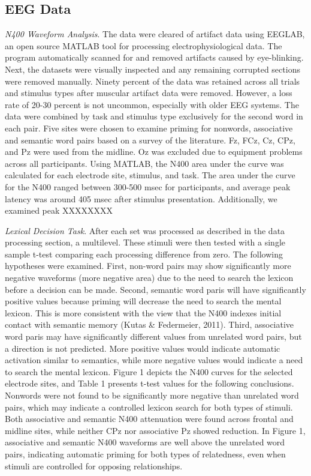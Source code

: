 \documentclass[english,man]{apa6}
\theoremstyle{definition}
\theoremstyle{definition}
\theoremstyle{remark}
\begin{document}
\subsection{EEG Data}\label{eeg-data}

\emph{N400 Waveform Analysis}. The data were cleared of artifact data
using EEGLAB, an open source MATLAB tool for processing
electrophysiological data. The program automatically scanned for and
removed artifacts caused by eye-blinking. Next, the datasets were
visually inspected and any remaining corrupted sections were removed
manually. Ninety percent of the data was retained across all trials and
stimulus types after muscular artifact data were removed. However, a
loss rate of 20-30 percent is not uncommon, especially with older EEG
systems. The data were combined by task and stimulus type exclusively
for the second word in each pair. Five sites were chosen to examine
priming for nonwords, associative and semantic word pairs based on a
survey of the literature. Fz, FCz, Cz, CPz, and Pz were used from the
midline. Oz was excluded due to equipment problems across all
participants. Using MATLAB, the N400 area under the curve was calculated
for each electrode site, stimulus, and task. The area under the curve
for the N400 ranged between 300-500 msec for participants, and average
peak latency was around 405 msec after stimulus presentation.
Additionally, we examined peak XXXXXXXX

\emph{Lexical Decision Task}. After each set was processed as described
in the data processing section, a multilevel. These stimuli were then
tested with a single sample t-test comparing each processing difference
from zero. The following hypotheses were examined. First, non-word pairs
may show significantly more negative waveforms (more negative area) due
to the need to search the lexicon before a decision can be made. Second,
semantic word paris will have significantly positive values because
priming will decrease the need to search the mental lexicon. This is
more consistent with the view that the N400 indexes initial contact with
semantic memory (Kutas \& Federmeier, 2011). Third, associative word
paris may have significantly different values from unrelated word pairs,
but a direction is not predicted. More positive values would indicate
automatic activation similar to semantics, while more negative values
would indicate a need to search the mental lexicon. Figure 1 depicts the
N400 curves for the selected electrode sites, and Table 1 presents
t-test values for the following conclusions. Nonwords were not found to
be significantly more negative than unrelated word pairs, which may
indicate a controlled lexicon search for both types of stimuli. Both
associative and semantic N400 attenuation were found across frontal and
midline sites, while neither CPz nor associative Pz showed reduction. In
Figure 1, associative and semantic N400 waveforms are well above the
unrelated word pairs, indicating automatic priming for both types of
relatedness, even when stimuli are controlled for opposing
relationships.
\end{document}
